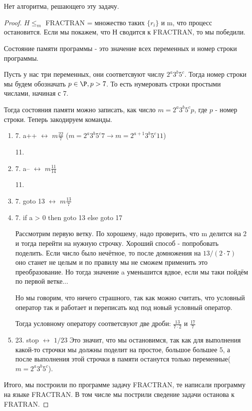 \begin{assertion}
	Нет алгоритма, решающего эту задачу.
\end{assertion}
\begin{proof}
	$H \le_m$ FRACTRAN = множество таких $\{r_i\}$ и m, что процесс остановится. Если мы покажем, что Н сводится к FRACTRAN, то мы победили.

	\begin{Def}
		Состояние памяти программы - это значение всех переменных и номер строки программы.
	\end{Def}

	Пусть у нас три переменных, они соответсвуют числу $2^a3^b5^c$. Тогда номер строки мы будем обозначать $p \in \P, p > 7$. То есть нумеровать
	строки простыми числами, начиная с 7.

	Тогда состояния памяти можно записать, как число $m = 2^a3^b5^cp$, где $p$ - номер строки. Теперь закодируем команды.

	\begin{enumerate}
		\item 
		7. a++   $\leftrightarrow$ $m\frac{22}{7}$ ($m = 2^a3^b5^c7 \rightarrow m = 2^{a + 1}3^b5^c11$)
		
		11.		
		\item 
		7. a--   $\leftrightarrow$ $m\frac{11}{14}$
		
		11.
		\item 
		7. goto 13 $\leftrightarrow$ $m\frac{13}{7}$
		\item 
		7. if a > 0 then goto 13 else goto 17

		Рассмотрим первую ветку. По хорошему, надо проверить, что m делится на 2 и тогда перейти на нужную строчку. Хороший способ - попробовать
		поделить. Если число было нечётное, то после домножения на $13/(2\cdot7)$ оно станет не целым и по правилу мы не сможем применить
		это преобразование. Но тогда значение a уменьшится вдвое, если мы таки пойдём по первой ветке...

		Но мы говорим, что ничего страшного, так как можно считать, что условный оператор так и работает и переписать код под новый условный 
		оператор.

		Тогда условному оператору соответсвуют две дроби: $\frac{13}{7\cdot2}$ и $\frac{17}{7}$
		\item 
		23. stop  $\leftrightarrow$ $1/23$ Это значит, что мы остановимся, так как для выполнения какой-то строчки мы должны поделит на простое,
		большое большее 5, а после выполнения этой строчки в памяти останутся только переменные($m = 2^a3^b5^c$).
	\end{enumerate}

	Итого, мы построили по программе задачу FRACTRAN, те написали программу на языке FRACTRAN. В том числе мы пострили сведение задачи останова
	к FRATRAN.
\end{proof}


